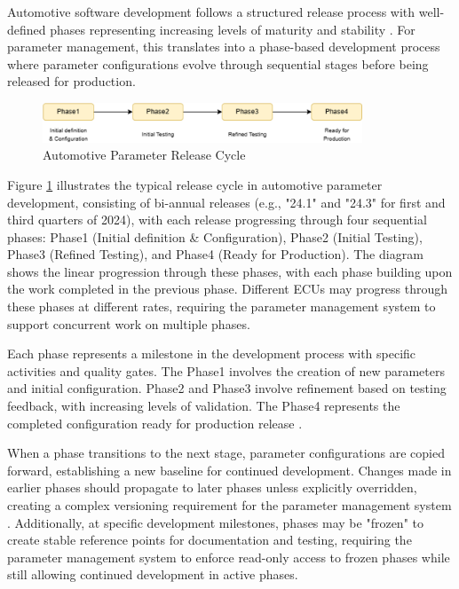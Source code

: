 Automotive software development follows a structured release process with well-defined phases representing increasing levels of maturity and stability \cite{broy2006challenges}. For parameter management, this translates into a phase-based development process where parameter configurations evolve through sequential stages before being released for production.

\begin{figure}[ht]
    \centering
    \includegraphics[width=0.85\textwidth]{figures/release_cycle.png}
    \caption{Automotive Parameter Release Cycle}
    \label{fig:release-cycle}
\end{figure}

Figure \ref{fig:release-cycle} illustrates the typical release cycle in automotive parameter development, consisting of bi-annual releases (e.g., "24.1" and "24.3" for first and third quarters of 2024), with each release progressing through four sequential phases: Phase1 (Initial definition \& Configuration), Phase2 (Initial Testing), Phase3 (Refined Testing), and Phase4 (Ready for Production). The diagram shows the linear progression through these phases, with each phase building upon the work completed in the previous phase. Different \acp{ECU} may progress through these phases at different rates, requiring the parameter management system to support concurrent work on multiple phases.

Each phase represents a milestone in the development process with specific activities and quality gates. The Phase1 involves the creation of new parameters and initial configuration. Phase2 and Phase3 involve refinement based on testing feedback, with increasing levels of validation. The Phase4 represents the completed configuration ready for production release \cite{staron2021automotive}.

When a phase transitions to the next stage, parameter configurations are copied forward, establishing a new baseline for continued development. Changes made in earlier phases should propagate to later phases unless explicitly overridden, creating a complex versioning requirement for the parameter management system \cite{pretschner2007software}. Additionally, at specific development milestones, phases may be "frozen" to create stable reference points for documentation and testing, requiring the parameter management system to enforce read-only access to frozen phases while still allowing continued development in active phases.


